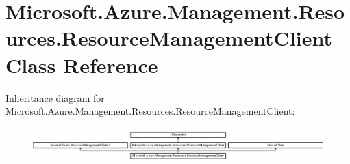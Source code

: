 \hypertarget{class_microsoft_1_1_azure_1_1_management_1_1_resources_1_1_resource_management_client}{}\section{Microsoft.\+Azure.\+Management.\+Resources.\+Resource\+Management\+Client Class Reference}
\label{class_microsoft_1_1_azure_1_1_management_1_1_resources_1_1_resource_management_client}


 


Inheritance diagram for Microsoft.\+Azure.\+Management.\+Resources.\+Resource\+Management\+Client\+:\begin{figure}[H]
\begin{center}
\leavevmode
\includegraphics[height=1.346154cm]{class_microsoft_1_1_azure_1_1_management_1_1_resources_1_1_resource_management_client}
\end{center}
\end{figure}
